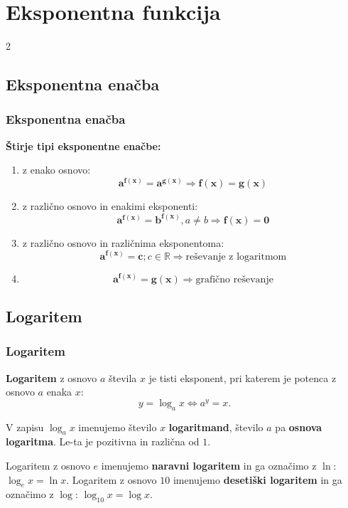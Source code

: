 \section{Eksponentna funkcija}

\begin{frame}
    \sectionpage
\end{frame}

\begin{frame}
    \begin{multicols}{2}
    \end{multicols}
\end{frame}

    \subsection{Eksponentna enačba}

        \begin{frame}
            \frametitle{Eksponentna enačba}

            \textbf{Štirje tipi eksponentne enačbe:}
            \begin{enumerate}
                \item z enako osnovo: $$\mathbf{a^{f(x)}=a^{g(x)}} \Rightarrow \mathbf{f(x)=g(x)}$$
                \item z različno osnovo in enakimi eksponenti:  $$\mathbf{a^{f(x)}=b^{f(x)}}, a\neq b \Rightarrow \mathbf{f(x)=0}$$
                \item z različno osnovo in različnima eksponentoma: $$\mathbf{a^{f(x)}=c}; c\in\mathbb{R} \Rightarrow \textrm{reševanje z logaritmom}$$
                \item $$\mathbf{a^{f(x)}=g(x)} \Rightarrow \textrm{grafično reševanje}$$
            \end{enumerate}

        \end{frame}

    \subsection{Logaritem}

        \begin{frame}
            \frametitle{Logaritem}

            \textbf{Logaritem} z osnovo $a$ števila $x$ je tisti eksponent, pri katerem je potenca z osnovo $a$ enaka $x$: $$y=\log_ax \Leftrightarrow a^y=x.$$

            V zapisu $\log_ax$ imenujemo število $x$ \textbf{logaritmand}, število $a$ pa \textbf{osnova logaritma}. Le-ta je pozitivna in različna od $1$.

            Logaritem z osnovo $e$ imenujemo \textbf{naravni logaritem} in ga označimo z $\ln$: $\log_ex=\ln x$.
            Logaritem z osnovo $10$ imenujemo \textbf{desetiški logaritem} in ga označimo z $\log$: $\log_{10}x=\log x$.

        \end{frame}

